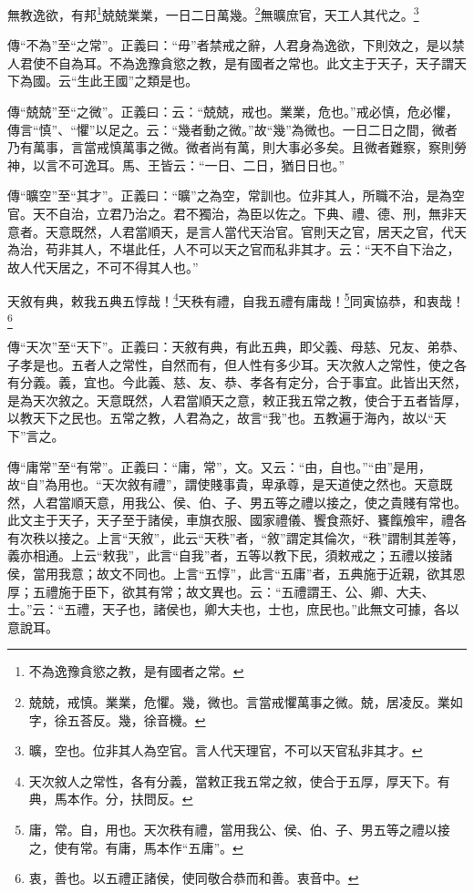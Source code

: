 無教逸欲，有邦\footnote{不為逸豫貪慾之教，是有國者之常。}兢兢業業，一日二日萬幾。\footnote{兢兢，戒慎。業業，危懼。幾，微也。言當戒懼萬事之微。兢，居凌反。業如字，徐五荅反。幾，徐音機。}無曠庶官，天工人其代之。\footnote{曠，空也。位非其人為空官。言人代天理官，不可以天官私非其才。}


{\noindent\zhuan{}\fzbyks 傳“不為”至“之常”。正義曰：“毋”者禁戒之辭，人君身為逸欲，下則效之，是以禁人君使不自為耳。不為逸豫貪慾之教，是有國者之常也。此文主于天子，天子謂天下為國。云“生此王國”之類是也。 \par}

{\noindent\zhuan{}\fzbyks 傳“兢兢”至“之微”。正義曰：云：“兢兢，戒也。業業，危也。”戒必慎，危必懼，傳言“慎”、“懼”以足之。云：“幾者動之微。”故“幾”為微也。一日二日之間，微者乃有萬事，言當戒慎萬事之微。微者尚有萬，則大事必多矣。且微者難察，察則勞神，以言不可逸耳。馬、王皆云：“一日、二日，猶日日也。” \par}

{\noindent\zhuan{}\fzbyks 傳“曠空”至“其才”。正義曰：“曠”之為空，常訓也。位非其人，所職不治，是為空官。天不自治，立君乃治之。君不獨治，為臣以佐之。下典、禮、德、刑，無非天意者。天意既然，人君當順天，是言人當代天治官。官則天之官，居天之官，代天為治，苟非其人，不堪此任，人不可以天之官而私非其才。云：“天不自下治之，故人代天居之，不可不得其人也。” \par}

天敘有典，敕我五典五惇哉！\footnote{天次敘人之常性，各有分義，當敕正我五常之敘，使合于五厚，厚天下。有典，馬本作。分，扶問反。}天秩有禮，自我五禮有庸哉！\footnote{庸，常。自，用也。天次秩有禮，當用我公、侯、伯、子、男五等之禮以接之，使有常。有庸，馬本作“五庸”。}同寅協恭，和衷哉！\footnote{衷，善也。以五禮正諸侯，使同敬合恭而和善。衷音中。}


{\noindent\zhuan{}\fzbyks 傳“天次”至“天下”。正義曰：天敘有典，有此五典，即父義、母慈、兄友、弟恭、子孝是也。五者人之常性，自然而有，但人性有多少耳。天次敘人之常性，使之各有分義。義，宜也。今此義、慈、友、恭、孝各有定分，合于事宜。此皆出天然，是為天次敘之。天意既然，人君當順天之意，敕正我五常之教，使合于五者皆厚，以教天下之民也。五常之教，人君為之，故言“我”也。五教遍于海內，故以“天下”言之。 \par}

{\noindent\zhuan{}\fzbyks 傳“庸常”至“有常”。正義曰：“庸，常”，文。又云：“由，自也。”“由”是用，故“自”為用也。“天次敘有禮”，謂使賤事貴，卑承尊，是天道使之然也。天意既然，人君當順天意，用我公、侯、伯、子、男五等之禮以接之，使之貴賤有常也。此文主于天子，天子至于諸侯，車旗衣服、國家禮儀、饗食燕好、饔餼飧牢，禮各有次秩以接之。上言“天敘”，此云“天秩”者，“敘”謂定其倫次，“秩”謂制其差等，義亦相通。上云“敕我”，此言“自我”者，五等以教下民，須敕戒之；五禮以接諸侯，當用我意；故文不同也。上言“五惇”，此言“五庸”者，五典施于近親，欲其恩厚；五禮施于臣下，欲其有常；故文異也。云：“五禮謂王、公、卿、大夫、士。”云：“五禮，天子也，諸侯也，卿大夫也，士也，庶民也。”此無文可據，各以意說耳。 \par}

